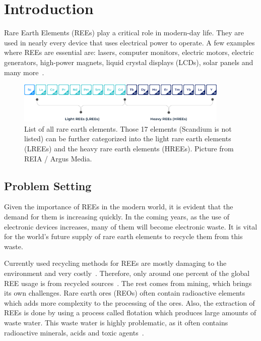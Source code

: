 \chapter{Introduction}

Rare Earth Elements (REEs) play a critical role in modern-day life.
They are used in nearly every device that uses electrical power to operate.
A few examples where REEs are essential are: lasers, computer monitors, electric motors, electric generators, high-power magnets, liquid crystal displays (LCDs), solar panels and many more~\cite{usageofrees}.

\begin{figure}[H]
    \centering
    \includegraphics[width=0.9\textwidth]{./media/images/rees_periodic_table}
    \caption{List of all rare earth elements. Those 17 elements (Scandium  is not listed) can be further categorized into the light rare earth elements (LREEs) and the heavy rare earth elements (HREEs). Picture from REIA / Argus Media.}
    \label{fig:list_rees}
\end{figure}


\section{Problem Setting\authorA{}}

Given the importance of REEs in the modern world, it is evident that the demand for them is increasing quickly.
In the coming years, as the use of electronic devices increases, many of them will become electronic waste.
It is vital for the world's future supply of rare earth elements to recycle them from this waste.

Currently used recycling methods for REEs are mostly damaging to the environment and very costly~\cite{recyclingcurrent}.
Therefore, only around one percent of the global REE usage is from recycled sources~\cite{currentrecyclingnumbers}.
The rest comes from mining, which brings its own challenges.
Rare earth ores (REOs) often contain radioactive elements which adds more complexity to the processing of the ores.
Also, the extraction of REEs is done by using a process called flotation which produces large amounts of waste water.
This waste water is highly problematic, as it often contains radioactive minerals, acids and toxic agents~\cite{reeenvimpact}.

